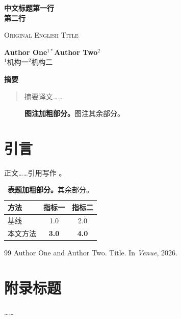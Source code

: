 
\newcommand{\sysname}{SystemName}   %


\thispagestyle{firstpage}   %

{\raggedright
{\LARGE\bfseries 中文标题第一行\\[2pt]第二行\par}
\vspace{4pt}
{\large\textsc{Original English Title}\par}
\vspace{12pt}
\hspace*{0.2in}\parbox{5in}{\linespread{1.0}\selectfont
\textbf{Author One}$^{1*}$\quad \textbf{Author Two}$^{2}$\\[2pt]
$^{1}$机构一\quad $^{2}$机构二}
\par}

\vspace{14pt}
\begin{center}{\large\bfseries 摘\quad 要}\end{center}
\vspace{-4pt}
\begin{quote}
摘要译文……
\end{quote}

\begin{figure}[h]
\centering
{}
\caption{\textbf{图注加粗部分。}图注其余部分。}
\label{fig:teaser}
\end{figure}

\section{引言}
正文……引用写作 \citep{key}。

\begin{table}[tbp]
\caption{\textbf{表题加粗部分。}其余部分。}
\centering\small
\begin{tabular}{@{}lcc@{}}
\toprule
方法 & 指标一 & 指标二 \\
\midrule
基线 & 1.0 & 2.0 \\
\rowcolor{rowlight}本文方法 & \textbf{3.0} & \textbf{4.0} \\
\bottomrule
\end{tabular}
\end{table}

\clearpage
\begin{thebibliography}{99}
\small
{}
Author One and Author Two.
\newblock Title.
\newblock In \emph{Venue}, 2026.
\end{thebibliography}

\clearpage
\appendix
\renewcommand{\thesection}{\Alph{section}}
\section{附录标题}
……

